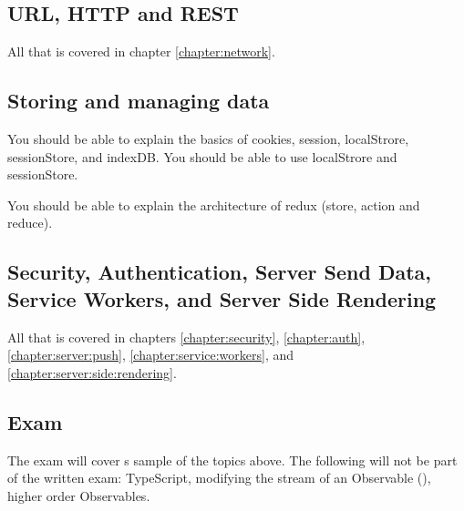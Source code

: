 \subsection*{URL, HTTP and REST}
All that is covered in chapter \ref{chapter:network}.

\subsection*{Storing and managing data}
You should be able to explain the basics of cookies, session, localStrore, sessionStore, and indexDB. You should be able to use localStrore and sessionStore.

You should be able to explain the architecture of redux (store, action and reduce).

\subsection*{Security, Authentication, Server Send Data, Service Workers, and Server Side Rendering}
All that is covered in chapters \ref{chapter:security}, \ref{chapter:auth}, \ref{chapter:server:push}, \ref{chapter:service:workers}, and \ref{chapter:server:side:rendering}.

\subsection*{Exam}
The exam will cover s sample of the topics above. The following will not be part of the written exam:
TypeScript, modifying the stream of an Observable (), higher order Observables.
